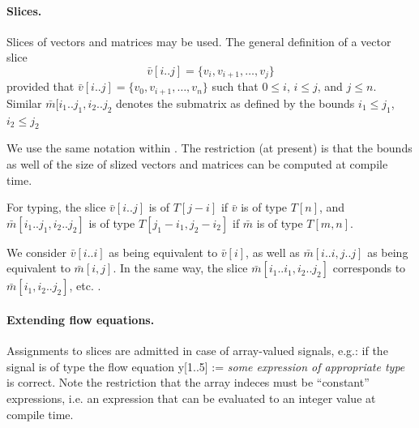 \paragraph{Slices.} Slices of vectors and matrices may be used. The general definition 
of a vector slice $$\bar{v}[i..j] = \{ v_{i}, v_{i+1}, \ldots , v_{j} \}$$ provided that 
$\bar{v}[i..j] = \{ v_{0}, v_{i+1}, \ldots , v_{n} \}$ such that $0 \leq i$, $i \leq j$,
 and $j \leq n$. Similar $\bar{m}[i_{1}..j_{1},i_{2}..j_{2}$ denotes the submatrix as 
 defined by the bounds $i_{1} \leq j_{1}$, $i_{2} \leq j_{2}$

We use the same notation within \se. The restriction (at present) is that the bounds as
 well of the size of slized vectors and matrices can be computed at compile time.
 
For typing, the slice $\bar{v}[i..j]$ is of $T[j-i]$ if $\bar{v}$ is of type $T[n]$, and
 $\bar{m}[i_{1}..j_{1},i_{2}..j_{2}]$ is of type $T[j_{1}-i_{1},j_{2}-i_{2}]$ if $\bar{m}$ is of type $T[m,n]$.

We consider $\bar{v}[i..i]$ as being equivalent to $\bar{v}[i]$, as well as $\bar{m}[i..i,j..j]$ as being equivalent to $\bar{m}[i,j]$. In the same way, the slice $\bar{m}[i_{1}..i_{1},i_{2}..j_{2}]$ corresponds to $\bar{m}[i_{1},i_{2}..j_{2}]$,
 etc. .


\paragraph{Extending flow equations.} Assignments to slices are admitted in case of array-valued signals, e.g.: if the signal  is of type  the flow equation
\BEP
y[1..5] := \textit{some expression of appropriate type}
\EEP
is correct. Note the restriction that the array indeces must be ``constant'' 
expressions,
i.e. an expression that can be evaluated to an integer value at compile time.
 
